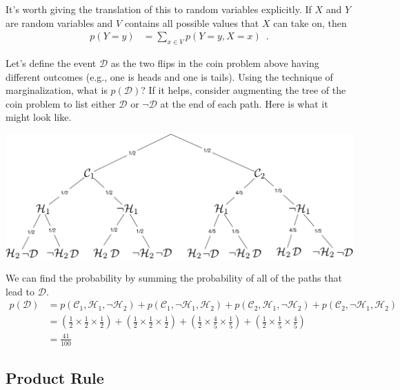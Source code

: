 \documentclass[review_Solutions]{subfiles}
\begin{document}
It's worth giving the translation of this to random variables explicitly.  If $X$ and $Y$ are random variables and $V$ contains all possible values that $X$ can take on, then
\begin{align}
p(Y=y) &= \sum_{x \in V} p(Y=y, X=x) \enspace .
\end{align}

\begin{exercise}
Let's define the event $\mathcal{D}$ as the two flips in the coin problem above having different outcomes (e.g., one is heads and one is tails).  Using the technique of marginalization, what is $p(\mathcal{D})$?  If it helps, consider augmenting the tree of the coin problem to list either $\mathcal{D}$ or $\neg \mathcal{D}$ at the end of each path.  Here is what it might look like.

\begin{center}
\includegraphics[width=0.8\linewidth]{figures/twocoins_with_diff}
\end{center}
\begin{boxedsolution}
We can find the probability by summing the probability of all of the paths that lead to $\mathcal{D}$.
\begin{align}
p(\mathcal{D}) &= p(\mathcal{C}_1, \mathcal{H}_1, \neg \mathcal{H}_2) + p(\mathcal{C}_1,\neg \mathcal{H}_1, \mathcal{H}_2) + p(\mathcal{C}_2, \mathcal{H}_1, \neg \mathcal{H}_2) + p(\mathcal{C}_2,\neg \mathcal{H}_1, \mathcal{H}_2) \nonumber \\
&= \left ( \frac{1}{2} \times \frac{1}{2} \times \frac{1}{2} \right) +  \left ( \frac{1}{2} \times \frac{1}{2} \times \frac{1}{2} \right) +  \left ( \frac{1}{2} \times \frac{4}{5} \times \frac{1}{5} \right) +  \left ( \frac{1}{2} \times \frac{1}{5} \times \frac{4}{5} \right) \nonumber \\
&= \frac{41}{100} \nonumber
\end{align}
\end{boxedsolution}
\end{exercise}


\subsection{Product Rule}
\end{document}

